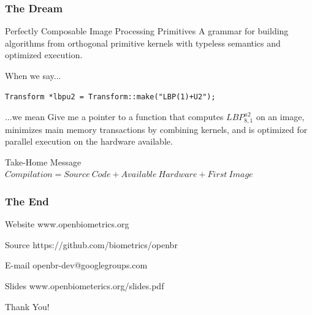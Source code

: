 \documentclass[12pt]{beamer}
\begin{document}
\begin{frame}[fragile]
\frametitle{The Dream}
\begin{exampleblock}{Perfectly Composable Image Processing Primitives}
A grammar for building algorithms from orthogonal primitive kernels with typeless semantics and optimized execution.
\end{exampleblock}
\pause
\begin{block}{When we say...}
\begin{verbatim}
Transform *lbpu2 = Transform::make("LBP(1)+U2");
\end{verbatim}
\end{block}
\pause
\begin{block}{...we mean}
Give me a pointer to a function that computes $LBP_{8,1}^{u2}$ on an image,
minimizes main memory transactions by combining kernels,
and is optimized for parallel execution on the hardware available.
\end{block}
\pause
\begin{exampleblock}{Take-Home Message}
$Compilation = Source\ Code + Available\ Hardware + First\ Image$
\end{exampleblock}
\end{frame}

\begin{frame}
\frametitle{The End}
\begin{block}{Website}
\centering
www.openbiometrics.org
\end{block}
\begin{block}{Source}
\centering
https://github.com/biometrics/openbr
\end{block}
\begin{block}{E-mail}
\centering
openbr-dev@googlegroups.com
\end{block}
\begin{block}{Slides}
\centering
www.openbiometerics.org/slides.pdf
\end{block}
\begin{center}
Thank You!
\end{center}
\end{frame}
\end{document}
